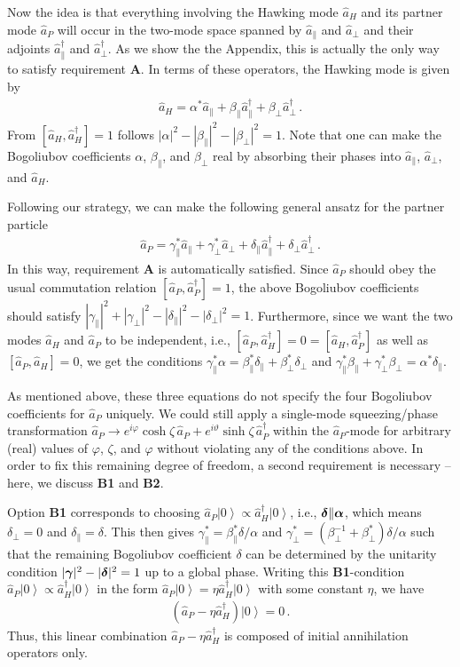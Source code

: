 \documentclass[aps,prd,showpacs,amssymb,nofootinbib,12pt]{revtex4-2}
\newcommand{\ket}[1]{\left|#1\right>}
\newcommand{\f}[1]{\mbox{\boldmath$#1$}}
\newcommand{\bea}{\begin{eqnarray}}
\newcommand{\ea}{\end{eqnarray}}
\begin{document}
%
Now the idea is that everything involving the Hawking mode $\hat a_H$ 
and its partner mode $\hat a_P$ will occur in the two-mode space
spanned by $\hat a_\|$ and $\hat a_\perp$ and their adjoints 
$\hat a_\|^\dagger$ and $\hat a_\perp^\dagger$.
%
As we show the the Appendix, this is actually the only way to 
satisfy requirement {\bf A}. 
%
In terms of these operators, the Hawking mode is given by 
%
\bea
\hat a_H=\alpha^*\hat a_\|
+\beta_\|\hat a_\|^\dagger+\beta_\perp\hat a_\perp^\dagger
\,.
\ea
%
From $[\hat a_H,\hat a_H^\dagger]=1$ follows 
$|\alpha|^2-|\beta_\||^2-|\beta_\perp|^2=1$. 
%
Note that one can make the Bogoliubov coefficients 
$\alpha$, $\beta_\|$, and $\beta_\perp$ real by 
absorbing their phases into  $\hat a_\|$, $\hat a_\perp$, 
and $\hat a_H$. 

Following our strategy, we can make the following general ansatz 
for the partner particle 
%
\bea
\label{partner-ansatz}
\hat a_P
=
\gamma_\|^*\hat a_\|+
\gamma_\perp^*\hat a_\perp+
\delta_\|\hat a_\|^\dagger+
\delta_\perp\hat a_\perp^\dagger
\,.
\ea
%
In this way, requirement {\bf A} is automatically satisfied. 
%
Since $\hat a_P$ should obey the usual commutation relation 
$[\hat a_P,\hat a_P^\dagger]=1$,  the  above Bogoliubov coefficients 
should satisfy $|\gamma_\||^2+|\gamma_\perp|^2-|\delta_\||^2-|\delta_\perp|^2=1$.
%
Furthermore, since we want the two modes $\hat a_H$ and $\hat a_P$
to be independent, i.e., 
$[\hat a_P,\hat a_H^\dagger]=0=[\hat a_H,\hat a_P^\dagger]$ as well as 
$[\hat a_P,\hat a_H]=0$, we get the conditions 
$\gamma_\|^*\alpha=\beta_\|^*\delta_\|+\beta_\perp^*\delta_\perp$ 
and 
$\gamma_\|^*\beta_\|+\gamma_\perp^*\beta_\perp=\alpha^*\delta_\|$. 

As mentioned above, these three equations do not specify the four 
Bogoliubov coefficients for $\hat a_P$ uniquely. 
%
We could still apply a single-mode squeezing/phase transformation 
$\hat a_P\to e^{i\varphi}\cosh\zeta\,\hat a_P+
e^{i\vartheta}\sinh\zeta\,\hat a_P^\dagger$ 
within the $\hat a_P$-mode for arbitrary (real) values of 
$\varphi$, $\zeta$, and $\varphi$ 
without violating any of the conditions above. 
%
In order to fix this remaining degree of freedom, a second requirement  
is necessary -- here, we discuss {\bf B1} and {\bf B2}.  

Option {\bf B1} corresponds to choosing 
$\hat a_P\ket{0}\propto\hat a_H^\dagger\ket{0}$, i.e., 
$\f{\delta}\|\f{\alpha}$, 
which means $\delta_\perp=0$ and $\delta_\|=\delta$. 
%
This then gives $\gamma_\|^*= \beta_\|^*\delta/\alpha$ and 
$\gamma_\perp^*=(\beta_\perp^{-1}+\beta_\perp^*)\delta/\alpha$
such that the remaining Bogoliubov coefficient $\delta$ can be 
determined by the unitarity condition 
$|\f{\gamma}|^2-|\f{\delta}|^2=1$ 
up to a global phase. 
%
Writing this {\bf B1}-condition $\hat a_P\ket{0}\propto\hat a_H^\dagger\ket{0}$
in the form $\hat a_P\ket{0}=\eta\hat a_H^\dagger\ket{0}$ with some constant 
$\eta$, we have 
%
\bea
\left(\hat a_P-\eta\hat a_H^\dagger\right)\ket{0}=0
\,.
\ea
%
Thus, this linear combination $\hat a_P-\eta\hat a_H^\dagger$
is composed of initial annihilation operators only. 
\end{document}
